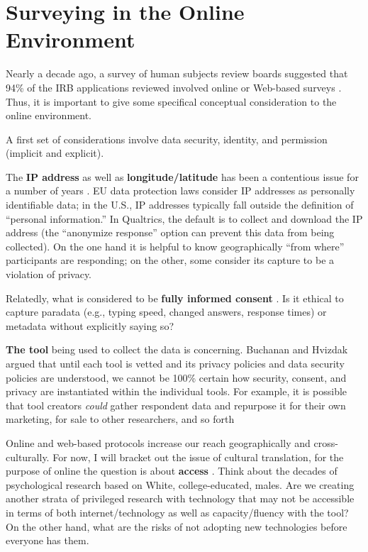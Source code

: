 \documentclass[
  english,
]{book}
\begin{document}
\hypertarget{surveying-in-the-online-environment}{%
\section{Surveying in the Online Environment}\label{surveying-in-the-online-environment}}

Nearly a decade ago, a survey of human subjects review boards suggested that 94\% of the IRB applications reviewed involved online or Web-based surveys \citep{buchanan_online_2009}. Thus, it is important to give some specifical conceptual consideration to the online environment.

A first set of considerations involve data security, identity, and permission (implicit and explicit).

The \textbf{IP address} as well as \textbf{longitude/latitude} has been a contentious issue for a number of years \citep{buchanan_online_2009}. EU data protection laws consider IP addresses as personally identifiable data; in the U.S., IP addresses typically fall outside the definition of ``personal information.'' In Qualtrics, the default is to collect and download the IP address (the ``anonymize response'' option can prevent this data from being collected). On the one hand it is helpful to know geographically ``from where'' participants are responding; on the other, some consider its capture to be a violation of privacy.

Relatedly, what is considered to be \textbf{fully informed consent} \citep{conrad_survey_2007}. Is it ethical to capture paradata (e.g., typing speed, changed answers, response times) or metadata without explicitly saying so?

\textbf{The tool} being used to collect the data is concerning. Buchanan and Hvizdak \citeyearpar{buchanan_online_2009} argued that until each tool is vetted and its privacy policies and data security policies are understood, we cannot be 100\% certain how security, consent, and privacy are instantiated within the individual tools. For example, it is possible that tool creators \emph{could} gather respondent data and repurpose it for their own marketing, for sale to other researchers, and so forth

Online and web-based protocols increase our reach geographically and cross-culturally. For now, I will bracket out the issue of cultural translation, for the purpose of online the question is about \textbf{access} \citep{conrad_survey_2007}. Think about the decades of psychological research based on White, college-educated, males. Are we creating another strata of privileged research with technology that may not be accessible in terms of both internet/technology as well as capacity/fluency with the tool? On the other hand, what are the risks of not adopting new technologies before everyone has them.
\end{document}
